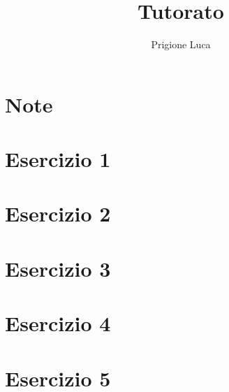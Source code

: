 \documentclass[a4paper,11pt,twoside,openany]{article}
\author{Prigione Luca}
\title{Tutorato}
\date{}
\begin{document}
\maketitle

\section*{Note}
\section*{Esercizio 1}
\section*{Esercizio 2}
\section*{Esercizio 3}
\section*{Esercizio 4}
\section*{Esercizio 5}

\end{document}
